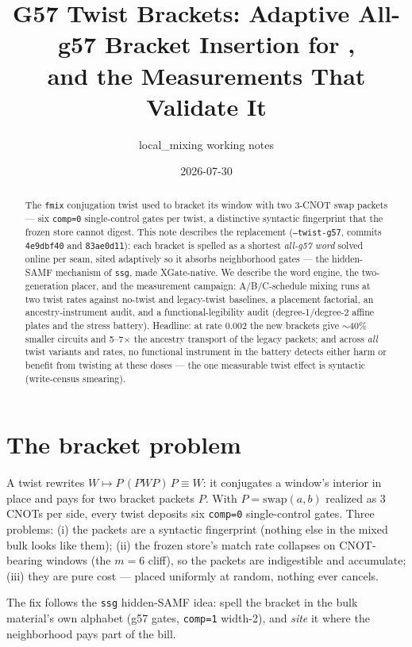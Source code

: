 \documentclass[11pt]{article}
\title{G57 Twist Brackets: Adaptive All-g57 Bracket Insertion for \code{fmix},\\
and the Measurements That Validate It}
\author{local\_mixing working notes}
\date{2026-07-30}
\newcommand{\code}[1]{\texttt{#1}}
\begin{document}
\maketitle

\begin{abstract}
The \code{fmix} conjugation twist used to bracket its window with two 3-CNOT
swap packets --- six \code{comp=0} single-control gates per twist, a distinctive
syntactic fingerprint that the frozen store cannot digest. This note describes
the replacement (\code{--twist-g57}, commits \code{4e9dbf40} and
\code{83ae0d11}): each bracket is spelled as a shortest \emph{all-g57 word}
solved online per seam, sited adaptively so it absorbs neighborhood gates ---
the hidden-SAMF mechanism of \code{ssg}, made XGate-native. We describe the
word engine, the two-generation placer, and the measurement campaign:
A/B/C-schedule mixing runs at two twist rates against no-twist and legacy-twist
baselines, a placement factorial, an ancestry-instrument audit, and a
functional-legibility audit (degree-1/degree-2 affine plates and the stress
battery). Headline: at rate $0.002$ the new brackets give $\sim$40\% smaller
circuits and 5--7$\times$ the ancestry transport of the legacy packets; and
across \emph{all} twist variants and rates, no functional instrument in the
battery detects either harm or benefit from twisting at these doses --- the
one measurable twist effect is syntactic (write-census smearing).
\end{abstract}

\section{The bracket problem}

A twist rewrites $W \mapsto P\,(P W P)\,P \equiv W$: it conjugates a window's
interior in place and pays for two bracket packets $P$. With
$P = \mathrm{swap}(a,b)$ realized as 3 CNOTs per side, every twist deposits six
\code{comp=0} single-control gates. Three problems: (i) the packets are a
syntactic fingerprint (nothing else in the mixed bulk looks like them);
(ii) the frozen store's match rate collapses on CNOT-bearing windows (the
$m{=}6$ cliff), so the packets are indigestible and accumulate; (iii) they are
pure cost --- placed uniformly at random, nothing ever cancels.

The fix follows the \code{ssg} hidden-SAMF idea: spell the bracket in the bulk
material's own alphabet (g57 gates, \code{comp=1} width-2), and \emph{site} it
where the neighborhood pays part of the bill.
\end{document}
